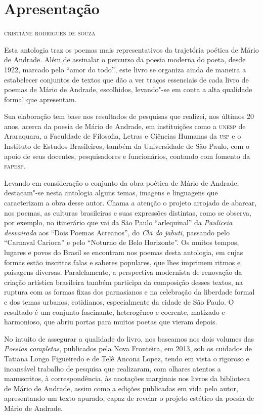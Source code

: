 \chapter{Apresentação}

\begin{flushright}
\textsc{cristiane rodrigues de souza}
\end{flushright}
\bigskip

\noindent{}Esta antologia traz os poemas mais representativos da
trajetória poética de Mário de Andrade.
Além de assinalar o percurso da poesia moderna do poeta,
desde 1922, marcado pelo ``amor do todo'', este livro
se organiza ainda de maneira a estabelecer conjuntos de textos que dão a
ver traços essenciais de cada livro de poemas de Mário de Andrade,
escolhidos, levando"-se em conta a alta qualidade formal que apresentam.

Sua elaboração tem base nos resultados de pesquisas que realizei, nos
últimos 20 anos, acerca da poesia de Mário de Andrade, em instituições
como a \textsc{unesp} de Araraquara, a Faculdade de Filosofia, Letras e Ciências
Humanas da \textsc{usp} e o Instituto de Estudos Brasileiros, também da
Universidade de São Paulo, com o apoio de seus docentes, pesquisadores e
funcionários, contando com fomento da \textsc{fapesp}.

Levando em consideração o conjunto da obra poética de Mário de Andrade,
destacam"-se nesta antologia alguns temas, imagens e linguagens que
caracterizam a obra desse autor. Chama a atenção o projeto arrojado de
abarcar, nos poemas, as culturas brasileiras e suas expressões
distintas, como se observa, por exemplo, no itinerário que vai da São
Paulo ``arlequinal'' da \emph{Pauliceia desvairada} aos ``Dois Poemas
Acreanos'', do \emph{Clã do jabuti}, passando pelo ``Carnaval Carioca''
e pelo ``Noturno de Belo Horizonte''. Os muitos tempos, lugares e povos
do Brasil se encontram nos poemas desta antologia, em cujas formas estão
inscritas falas e saberes populares, que lhes imprimem ritmos e
paisagens diversas. Paralelamente, a perspectiva modernista de
renovação da criação artística brasileira também participa da
composição desses textos, na ruptura com as formas fixas dos parnasianos
e na celebração da liberdade formal e dos temas urbanos, cotidianos,
especialmente da cidade de São Paulo. O resultado é um conjunto
fascinante, heterogêneo e coerente, matizado e harmonioso, que abriu
portas para muitos poetas que vieram depois.

No intuito de assegurar a qualidade do livro, nos baseamos nos dois
volumes das \emph{Poesias completas}, publicados pela Nova Fronteira, em
2013, sob os cuidados de Tatiana Longo Figueiredo e de Telê Ancona
Lopez, tendo em vista o rigoroso e incansável trabalho de pesquisa que
realizaram, com olhares atentos a manuscritos, à correspondência, às
anotações marginais nos livros da biblioteca de Mário de Andrade, assim
como a edições publicadas em vida pelo autor, apresentando um texto
apurado, capaz de revelar o projeto estético da poesia de Mário de
Andrade.

